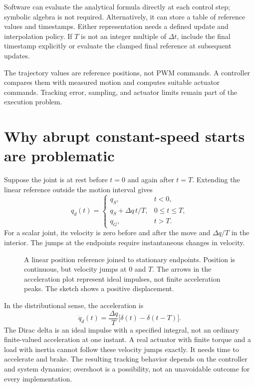 Software can evaluate the analytical formula directly at each control
step; symbolic algebra is not required. Alternatively, it can store a
table of reference values and timestamps. Either representation needs a
defined update and interpolation policy. If $T$ is not an integer multiple
of $\Delta t$, include the final timestamp explicitly or evaluate the
clamped final reference at subsequent updates.

The trajectory values are reference positions, not PWM commands. A
controller compares them with measured motion and computes suitable
actuator commands. Tracking error, sampling, and actuator limits remain
part of the execution problem.

\section{Why abrupt constant-speed starts are problematic}
Suppose the joint is at rest before $t=0$ and again after $t=T$. Extending
the linear reference outside the motion interval gives
\[
 q_d(t)=\begin{cases}
 q_S,&t<0,\\
 q_S+\Delta q\,t/T,&0\le t\le T,\\
 q_G,&t>T.
 \end{cases}
\]
For a scalar joint, its velocity is zero before and after the move and
$\Delta q/T$ in the interior. The jumps at the endpoints require
instantaneous changes in velocity.

\begin{figure}[htbp]
\centering
\caption{A linear position reference joined to stationary endpoints.
Position is continuous, but velocity jumps at $0$ and $T$. The arrows in
the acceleration plot represent ideal impulses, not finite acceleration
peaks. The sketch shows a positive displacement.}
\label{fig:l12-linear-profile}
\end{figure}

In the distributional sense, the acceleration is
\[
 \ddot q_d(t)=\frac{\Delta q}{T}\bigl[\delta(t)-\delta(t-T)\bigr].
\]
The Dirac delta is an ideal impulse with a specified integral, not an
ordinary finite-valued acceleration at one instant. A real actuator with
finite torque and a load with inertia cannot follow these velocity jumps
exactly. It needs time to accelerate and brake. The resulting tracking
behavior depends on the controller and system dynamics; overshoot is a
possibility, not an unavoidable outcome for every implementation.


